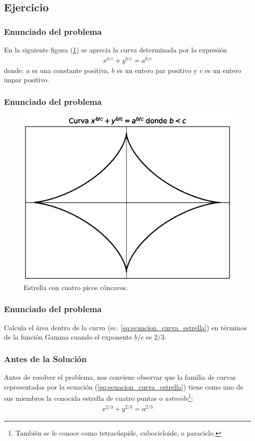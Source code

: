 \subsection{Ejercicio}

\begin{frame}
\frametitle{Enunciado del problema}
En la siguiente figura (\ref{fig:figura_curva_estrella}) se aprecia la curva determinada por la expresión
\begin{align}
x^{b/c} + y^{b/c} = a^{b/c}
\label{eq:ecuacion_curva_estrella}
\end{align}
donde: $a$ es una constante positiva, $b$ es un entero par positivo y $c$ es un entero impar positivo.
\end{frame}
\begin{frame}
\frametitle{Enunciado del problema}
\begin{figure}[H]
    \centering
    \includegraphics[scale=0.5]{Imagenes/plot_curva_estrella_01.eps}
    \caption{Estrella con cuatro picos cóncavos.}
    \label{fig:figura_curva_estrella}
\end{figure}
\end{frame}
\begin{frame}
\frametitle{Enunciado del problema}
Calcula el área dentro de la curva (ec. \ref{eq:ecuacion_curva_estrella}) en términos de la función Gamma cuando el exponente $b/c$ es $2/3$.
\end{frame}
\begin{frame}
\frametitle{Antes de la Solución}
Antes de resolver el problema, nos conviene observar que la familia de curvas representadas por la ecuación (\ref{eq:ecuacion_curva_estrella}) tiene como uno de sus miembros la conocida estrella de cuatro puntas o \emph{astroide}\footnote{También se le conoce como tetracúspide, cubocicloide, o paraciclo.}:
\begin{align*}
x^{2/3} + y^{2/3} = a^{2/3}
\end{align*}
\end{frame}
